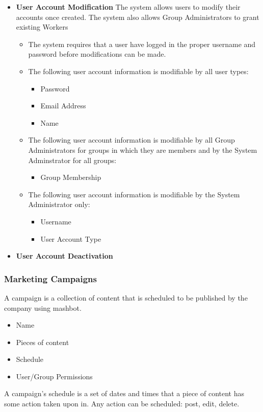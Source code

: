 \documentclass{article}
\begin{document}
\begin{itemize}
\begin{itemize}
					\end{itemize}
				\item \textbf{User Account Modification} The system allows users 
				to modify their accounts once created. The system also allows 
				Group Administrators to grant existing Workers 
				\begin{itemize}
					\item The system requires that a user have logged in the 
					proper username and password before modifications can be 
					made.
					\item The following user account information is modifiable 
					by all user types:
						\begin{itemize}
							\item Password
							\item Email Address
							\item Name
						\end{itemize}

					\item The following user account information is modifiable
					by all Group Administrators for groups in which they are 
						members and by the System Adminstrator for all groups:
						\begin{itemize}
							\item Group Membership
						\end{itemize}

					\item The following user account information is modifiable
					by the System Administrator only:
						\begin{itemize}
							\item Username
							\item User Account Type
						\end{itemize}
				\end{itemize}
				
				\item \textbf{User Account Deactivation} 
						

			\end{itemize}

		\subsubsection{Marketing Campaigns} %
                A campaign is a collection of content that is scheduled to be published by the company using mashbot.
                \begin{itemize}
                  \item Name
                  \item Pieces of content
                  \item Schedule
                  \item User/Group Permissions
                \end{itemize}
                A campaign's schedule is a set of dates and times that a piece of content has some action taken upon in.  Any action can be scheduled: post, edit, delete.
                
\end{document}
